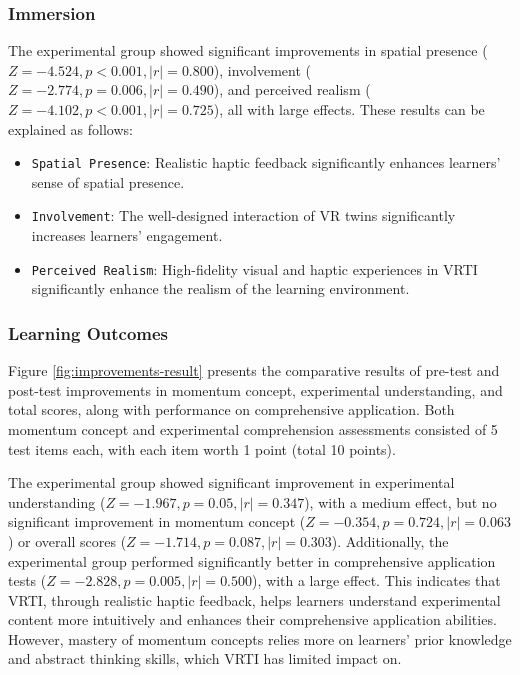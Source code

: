 \documentclass[runningheads]{llncs}
\begin{document}
\subsubsection{Immersion}
The experimental group showed significant improvements in spatial presence ($Z=-4.524, p<0.001, |r|=0.800$), involvement ($Z=-2.774, p=0.006, |r|=0.490$), and perceived realism ($Z=-4.102, p<0.001, |r|=0.725$), all with large effects. These results can be explained as follows:

\begin{itemize}
  \item {\texttt{Spatial Presence}}: Realistic haptic feedback significantly enhances learners' sense of spatial presence.

  \item {\texttt{Involvement}}: The well-designed interaction of VR twins significantly increases learners' engagement.

  \item {\texttt{Perceived Realism}}: High-fidelity visual and haptic experiences in VRTI significantly enhance the realism of the learning environment.
\end{itemize}

\subsubsection{Learning Outcomes}
Figure \ref{fig:improvements-result} presents the comparative results of pre-test and post-test improvements in momentum concept, experimental understanding, and total scores, along with performance on comprehensive application. Both momentum concept and experimental comprehension assessments consisted of 5 test items each, with each item worth 1 point (total 10 points).

The experimental group showed significant improvement in experimental understanding ($Z=-1.967, p=0.05, |r|=0.347$), with a medium effect, but no significant improvement in momentum concept ($Z=-0.354, p=0.724, |r|=0.063$) or overall scores ($Z=-1.714, p=0.087, |r|=0.303$). Additionally, the experimental group performed significantly better in comprehensive application tests ($Z=-2.828, p=0.005, |r|=0.500$), with a large effect. This indicates that VRTI, through realistic haptic feedback, helps learners understand experimental content more intuitively and enhances their comprehensive application abilities. However, mastery of momentum concepts relies more on learners' prior knowledge and abstract thinking skills, which VRTI has limited impact on.
\end{document}

